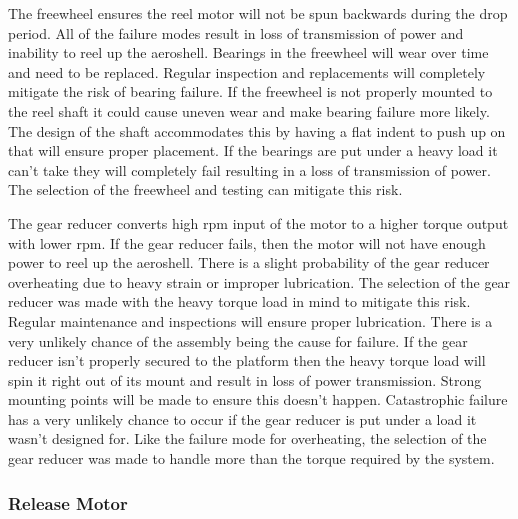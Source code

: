 \indent\indent The freewheel ensures the reel motor will not be spun backwards during the drop period. All of the failure modes result in loss of transmission of power and inability to reel up the aeroshell. Bearings in the freewheel will wear over time and need to be replaced. Regular inspection and replacements will completely mitigate the risk of bearing failure. If the freewheel is not properly mounted to the reel shaft it could cause uneven wear and make bearing failure more likely. The design of the shaft accommodates this by having a flat indent to push up on that will ensure proper placement. If the bearings are put under a heavy load it can’t take  they will completely fail resulting in a loss of transmission of power. The selection of the freewheel and testing can mitigate this risk. 
	
\indent\indent The gear reducer converts high rpm input of the motor to a higher torque output with lower rpm. If the gear reducer fails, then the motor will not have enough power to reel up the aeroshell. There is a slight probability of the gear reducer overheating due to heavy strain or improper lubrication. The selection of the gear reducer was made with the heavy torque load in mind to mitigate this risk. Regular maintenance and inspections will ensure proper lubrication. There is a very unlikely chance of the assembly being the cause for failure. If the gear reducer isn’t properly secured to the platform then the heavy torque load will spin it right out of its mount and result in loss of power transmission. Strong mounting points will be made to ensure this doesn’t happen. Catastrophic failure has a very unlikely chance to occur if the gear reducer is put under a load it wasn’t designed for. Like the failure mode for overheating, the selection of the gear reducer was made to handle more than the torque required by the system.



\subsubsection{Release Motor}

